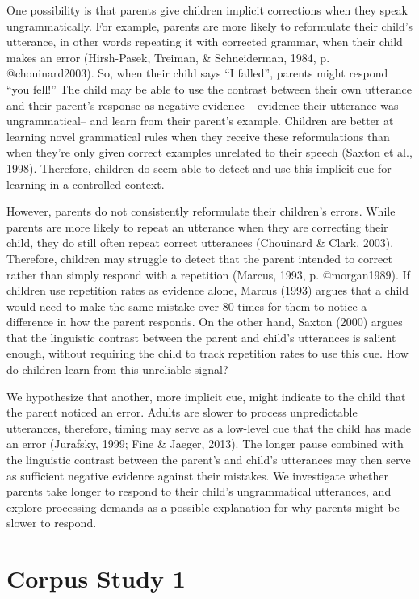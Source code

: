 \documentclass[10pt, letterpaper]{article}
\begin{document}
One possibility is that parents give children implicit corrections when
they speak ungrammatically. For example, parents are more likely to
reformulate their child's utterance, in other words repeating it with
corrected grammar, when their child makes an error (Hirsh-Pasek,
Treiman, \& Schneiderman, 1984, p. @chouinard2003). So, when their child
says ``I falled'', parents might respond ``you fell!'' The child may be
able to use the contrast between their own utterance and their parent's
response as negative evidence -- evidence their utterance was
ungrammatical-- and learn from their parent's example. Children are
better at learning novel grammatical rules when they receive these
reformulations than when they're only given correct examples unrelated
to their speech (Saxton et al., 1998). Therefore, children do seem able
to detect and use this implicit cue for learning in a controlled
context.

However, parents do not consistently reformulate their children's
errors. While parents are more likely to repeat an utterance when they
are correcting their child, they do still often repeat correct
utterances (Chouinard \& Clark, 2003). Therefore, children may struggle
to detect that the parent intended to correct rather than simply respond
with a repetition (Marcus, 1993, p. @morgan1989). If children use
repetition rates as evidence alone, Marcus (1993) argues that a child
would need to make the same mistake over 80 times for them to notice a
difference in how the parent responds. On the other hand, Saxton (2000)
argues that the linguistic contrast between the parent and child's
utterances is salient enough, without requiring the child to track
repetition rates to use this cue. How do children learn from this
unreliable signal?

We hypothesize that another, more implicit cue, might indicate to the
child that the parent noticed an error. Adults are slower to process
unpredictable utterances, therefore, timing may serve as a low-level cue
that the child has made an error (Jurafsky, 1999; Fine \& Jaeger, 2013).
The longer pause combined with the linguistic contrast between the
parent's and child's utterances may then serve as sufficient negative
evidence against their mistakes. We investigate whether parents take
longer to respond to their child's ungrammatical utterances, and explore
processing demands as a possible explanation for why parents might be
slower to respond.

\hypertarget{corpus-study-1}{%
\section{Corpus Study 1}\label{corpus-study-1}}
\end{document}
